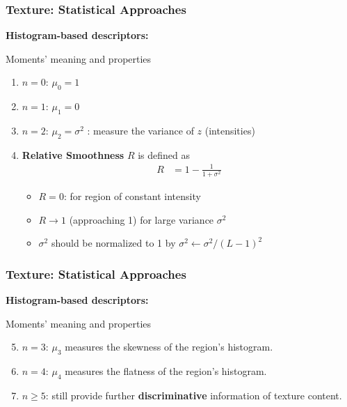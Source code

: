 \documentclass[english,11pt,table,handout]{beamer}
\begin{document}
\frame
{
	\frametitle{Texture: Statistical Approaches}
	\large
	\textbf{Histogram-based descriptors: }
	\newline
	
	\begin{block}{Moments' meaning and properties}
		\begin{enumerate}
			\item $n=0$: $\mu_0 = 1$
			\item $n=1$: $\mu_1 = 0$
			\item $n=2$: $\mu_2 = \sigma^2$ : measure the variance of $z$ (intensities)
			\item \textbf{Relative Smoothness} $R$ is defined as
			\begin{equation}
				\begin{split}
				\nonumber
				R &= 1 - \frac{1}{1 + \sigma^2}
				\end{split}
			\end{equation}
			\begin{itemize}
				\item $R = 0$: for region of  constant intensity
				\item $R \rightarrow 1$ (approaching 1) for large variance $\sigma^2$
				\item $\sigma^2$ should be normalized to 1 by $\sigma^2 \leftarrow \sigma^2/(L-1)^2$
			\end{itemize}
		\end{enumerate}
	\end{block}
	
}
\frame
{
	\frametitle{Texture: Statistical Approaches}
	\large
	\textbf{Histogram-based descriptors: }
	\newline
	
	\begin{block}{Moments' meaning and properties}
		\begin{enumerate}
			\setcounter{enumi}{4}
			\item $n=3$: $\mu_3$ measures the skewness of the region's histogram.
			\item $n=4$: $\mu_4$ measures the flatness of the region's histogram.
			\item $n\ge 5$: still provide further \textbf{discriminative} information of texture content.
			
		\end{enumerate}
	\end{block}
	
}
\frame
\end{document}
